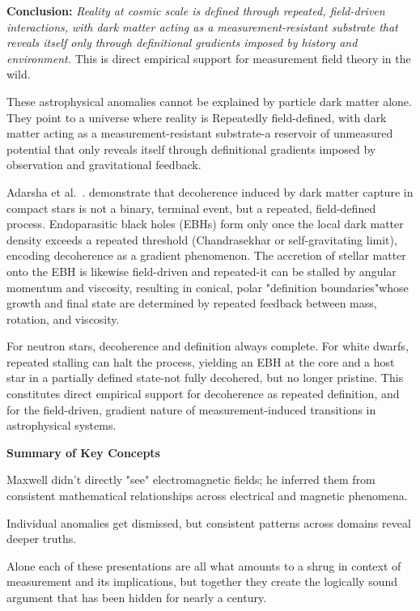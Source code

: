 \textbf{Conclusion:}  
\emph{Reality at cosmic scale is defined through repeated, field-driven interactions, with dark matter acting as a measurement-resistant substrate that reveals itself only through definitional gradients imposed by history and environment.} This is direct empirical support for measurement field theory in the wild.

These astrophysical anomalies cannot be explained by particle dark matter alone. They point to a universe where reality is Repeatedly field-defined, with dark matter acting as a measurement-resistant substrate-a reservoir of unmeasured potential that only reveals itself through definitional gradients imposed by observation and gravitational feedback.

Adarsha et al.~\cite{adarsha_accretion_2025}. demonstrate that decoherence induced by dark matter capture in compact stars is not a binary, terminal event, but a repeated, field-defined process. Endoparasitic black holes (EBHs) form only once the local dark matter density exceeds a repeated threshold (Chandrasekhar or self-gravitating limit), encoding decoherence as a gradient phenomenon. The accretion of stellar matter onto the EBH is likewise field-driven and repeated-it can be stalled by angular momentum and viscosity, resulting in conical, polar "definition boundaries"whose growth and final state are determined by repeated feedback between mass, rotation, and viscosity.

For neutron stars, decoherence and definition always complete. For white dwarfs, repeated stalling can halt the process, yielding an EBH at the core and a host star in a partially defined state-not fully decohered, but no longer pristine. This constitutes direct empirical support for decoherence as repeated definition, and for the field-driven, gradient nature of measurement-induced transitions in astrophysical systems.

\textbf{Summary of Key Concepts}

Maxwell didn't directly "see" electromagnetic fields; he inferred them from consistent mathematical relationships across electrical and magnetic phenomena.

Individual anomalies get dismissed, but consistent patterns across domains reveal deeper truths.

Alone each of these presentations are all what amounts to a shrug in context of measurement and its implications, but together they create the logically sound argument that has been hidden for nearly a century. 

